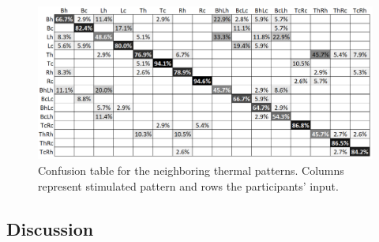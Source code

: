 \documentclass[preprint,12pt]{elsarticle}
\begin{document}

\begin{figure}[tp]
  \centering
  \includegraphics[width=0.9\columnwidth]{img/fig11.png}
  \caption{Confusion table for the neighboring thermal patterns. Columns represent stimulated pattern and rows the participants' input.}
  \label{fig:11}
\end{figure}

\subsection{Discussion}
\end{document}
